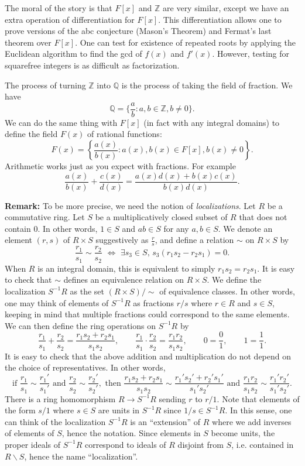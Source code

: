 \documentclass{article}
\def\Z{{\mathbb Z}}
\def\Q{{\mathbb Q}}
\def\Z{{\mathbb Z}}
\def\Q{{\mathbb Q}}
\begin{document}
The moral of the story is that $F[x]$ and $\Z$ are very similar, except we have an extra operation of differentiation for $F[x]$. This differentiation allows one to prove versions of the abc conjecture (Mason's Theorem) and Fermat's last theorem over $F[x]$. One can test for existence of repeated roots by applying the Euclidean algorithm to find the gcd of $f(x)$ and $f'(x)$. However, testing for squarefree integers is as difficult as factorization.

The process of turning $\Z$ into $\Q$ is the process of taking the field of fraction. We have
$$\Q = \{\frac{a}{b}\colon a,b\in\Z, b\neq 0\}.$$
We can do the same thing with $F[x]$ (in fact with any integral domains) to define the field $F(x)$ of rational functions:
$$F(x) = \left\{\frac{a(x)}{b(x)}\colon a(x),b(x)\in F[x], b(x)\neq 0\right\}.$$
Arithmetic works just as you expect with fractions. For example
$$\frac{a(x)}{b(x)} + \frac{c(x)}{d(x)} = \frac{a(x)d(x) + b(x)c(x)}{b(x)d(x)}.$$

\noindent\textbf{Remark:} To be more precise, we need the notion of \textit{localizations}. Let $R$ be a commutative ring. Let $S$ be a multiplicatively closed subset of $R$ that does not contain $0$. In other words, $1\in S$ and $ab\in S$ for any $a,b\in S$. We denote an element $(r,s)$ of $R\times S$ suggestively as $\frac{r}{s}$, and define a relation $\sim$ on $R\times S$ by 
$$\frac{r_1}{s_1}\sim\frac{r_2}{s_2} \,\,\Longleftrightarrow\,\, \exists s_3\in S,\, s_3(r_1s_2 - r_2s_1) = 0.$$
When $R$ is an integral domain, this is equivalent to simply $r_1s_2 = r_2s_1$. It is easy to check that $\sim$ defines an equivalence relation on $R\times S$. We define the localization $S^{-1}R$ as the set $(R\times S)/\sim$ of equivalence classes. In other words, one may think of elements of $S^{-1}R$ as fractions $r/s$ where $r\in R$ and $s\in S$, keeping in mind that multiple fractions could correspond to the same elements. We can then define the ring operations on $S^{-1}R$ by
$$\frac{r_1}{s_1} + \frac{r_2}{s_2} = \frac{r_1s_2 + r_2s_1}{s_1s_2},\qquad \frac{r_1}{s_1} \cdot \frac{r_2}{s_2} = \frac{r_1r_2}{s_1s_2},\qquad 0 = \frac{0}{1},\qquad 1 = \frac{1}{1}.$$
It is easy to check that the above addition and multiplication do not depend on the choice of representatives. In other words, 
$$\mbox{if }\frac{r_1}{s_1}\sim\frac{r_1'}{s_1'}\mbox{ and }\frac{r_2}{s_2}\sim\frac{r_2'}{s_2'},\mbox{ then }\frac{r_1s_2 + r_2s_1}{s_1s_2}\sim\frac{r_1's_2' + r_2's_1'}{s_1's_2'}\mbox{ and }\frac{r_1r_2}{s_1s_2}\sim\frac{r_1'r_2'}{s_1's_2'}.$$
There is a ring homomorphism $R\rightarrow S^{-1}R$ sending $r$ to $r/1$. Note that elements of the form $s/1$ where $s\in S$ are units in $S^{-1}R$ since $1/s\in S^{-1}R$. In this sense, one can think of the localization $S^{-1}R$ is an ``extension'' of $R$ where we add inverses of elements of $S$, hence the notation. Since elements in $S$ become units, the proper ideals of $S^{-1}R$ correspond to ideals of $R$ disjoint from $S$, i.e. contained in $R\backslash S$, hence the name ``localization''.
\end{document}
